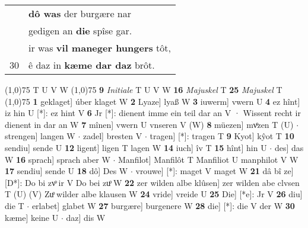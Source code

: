 \documentclass[8pt,a4paper,notitlepage]{article}
\begin{document}
\begin{table}[ht]
\begin{minipage}[t]{0.5\linewidth}
\begin{tabular}{rl}
 & \textbf{dô was} der burgære nar\\ 
 & gedigen an \textbf{die} spîse gar.\\ 
 & ir was \textbf{vil maneger hungers} tôt,\\ 
30 & ê daz in \textbf{kæme dar daz} brôt.\\ 
\end{tabular}
\scriptsize
\line(1,0){75} \newline
T U V W \newline
\line(1,0){75} \newline
\textbf{9} \textit{Initiale} T U V W  \textbf{16} \textit{Majuskel} T  \textbf{25} \textit{Majuskel} T  \newline
\line(1,0){75} \newline
\textbf{1} geklaget] úber klaget W \textbf{2} Lyaze] lyaß W \textbf{3} iuwerm] vwern U \textbf{4} ez hînt] iz hin U [*]: ez hint V \textbf{6} Jr [*]: dienent imme ein teil dar an V · Wissent recht ir dienent in dar an W \textbf{7} mînen] vwern U vnseren V (W) \textbf{8} müezen] mvͦzen T (U)  $\cdot$ strengen] langen W  $\cdot$ zadel] bresten V  $\cdot$ tragen] [*]: tragen T \textbf{9} Kyot] kŷot T \textbf{10} sendiu] sende U \textbf{12} ligent] ligen T lagen W \textbf{14} iuch] îv T \textbf{15} hînt] hin U  $\cdot$ des] das W \textbf{16} sprach] sprach aber W  $\cdot$ Manfilot] Manfilôt T Manfiliot U manphilot V W \textbf{17} sendiu] sende U \textbf{18} dô] Des W  $\cdot$ vrouwe] [*]: maget V maget W \textbf{21} dâ bî ze] [D*]: Do bi zvͦ ir V Do bei zuͦ W \textbf{22} zer wilden albe klûsen] zer wilden abe clvsen T (U) (V) Zuͦ wilder albe klausen W \textbf{24} vride] vreide U \textbf{25} Die] [*e]: Jr V \textbf{26} diu] die T  $\cdot$ erlabet] glabet W \textbf{27} burgære] burgenere W \textbf{28} die] [*]: die V der W \textbf{30} kæme] keine U  $\cdot$ daz] dis W \newline
\end{minipage}
\end{table}
\end{document}
